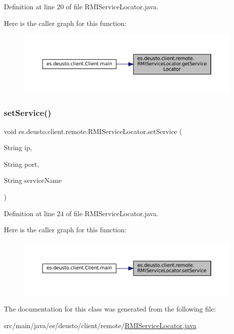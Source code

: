 Definition at line 20 of file R\+M\+I\+Service\+Locator.\+java.

Here is the caller graph for this function\+:
\nopagebreak
\begin{figure}[H]
\begin{center}
\leavevmode
\includegraphics[width=350pt]{classes_1_1deusto_1_1client_1_1remote_1_1_r_m_i_service_locator_a8054c4752675c3d8703a0ba79fb1c2c0_icgraph}
\end{center}
\end{figure}
\mbox{\label{classes_1_1deusto_1_1client_1_1remote_1_1_r_m_i_service_locator_a336e3b578829c4f0e99e66af6955640a}} 
\subsubsection{\texorpdfstring{setService()}{setService()}}
{\footnotesize\ttfamily void es.\+deusto.\+client.\+remote.\+R\+M\+I\+Service\+Locator.\+set\+Service (\begin{DoxyParamCaption}\item[{String}]{ip,  }\item[{String}]{port,  }\item[{String}]{service\+Name }\end{DoxyParamCaption})}



Definition at line 24 of file R\+M\+I\+Service\+Locator.\+java.

Here is the caller graph for this function\+:
\nopagebreak
\begin{figure}[H]
\begin{center}
\leavevmode
\includegraphics[width=350pt]{classes_1_1deusto_1_1client_1_1remote_1_1_r_m_i_service_locator_a336e3b578829c4f0e99e66af6955640a_icgraph}
\end{center}
\end{figure}


The documentation for this class was generated from the following file\+:\begin{DoxyCompactItemize}
\item 
src/main/java/es/deusto/client/remote/\mbox{\hyperlink{_r_m_i_service_locator_8java}{R\+M\+I\+Service\+Locator.\+java}}\end{DoxyCompactItemize}
